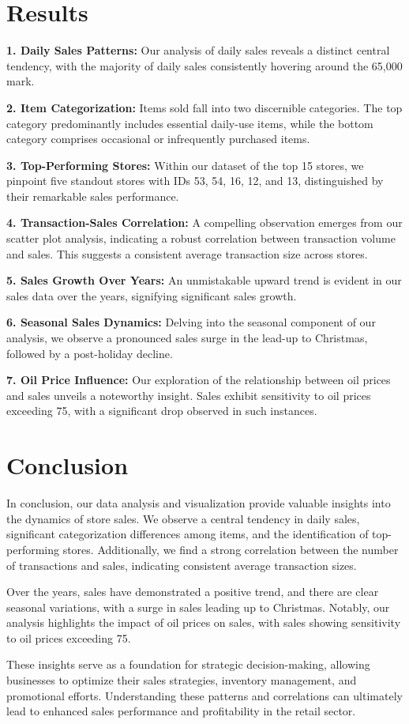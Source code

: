 \documentclass[
]{article}
\begin{document}
\hypertarget{results}{%
\section{Results}\label{results}}

\textbf{1. Daily Sales Patterns:} Our analysis of daily sales reveals a
distinct central tendency, with the majority of daily sales consistently
hovering around the 65,000 mark.

\textbf{2. Item Categorization:} Items sold fall into two discernible
categories. The top category predominantly includes essential daily-use
items, while the bottom category comprises occasional or infrequently
purchased items.

\textbf{3. Top-Performing Stores:} Within our dataset of the top 15
stores, we pinpoint five standout stores with IDs 53, 54, 16, 12, and
13, distinguished by their remarkable sales performance.

\textbf{4. Transaction-Sales Correlation:} A compelling observation
emerges from our scatter plot analysis, indicating a robust correlation
between transaction volume and sales. This suggests a consistent average
transaction size across stores.

\textbf{5. Sales Growth Over Years:} An unmistakable upward trend is
evident in our sales data over the years, signifying significant sales
growth.

\textbf{6. Seasonal Sales Dynamics:} Delving into the seasonal component
of our analysis, we observe a pronounced sales surge in the lead-up to
Christmas, followed by a post-holiday decline.

\textbf{7. Oil Price Influence:} Our exploration of the relationship
between oil prices and sales unveils a noteworthy insight. Sales exhibit
sensitivity to oil prices exceeding 75, with a significant drop observed
in such instances.

\hypertarget{conclusion}{%
\section{Conclusion}\label{conclusion}}

In conclusion, our data analysis and visualization provide valuable
insights into the dynamics of store sales. We observe a central tendency
in daily sales, significant categorization differences among items, and
the identification of top-performing stores. Additionally, we find a
strong correlation between the number of transactions and sales,
indicating consistent average transaction sizes.

Over the years, sales have demonstrated a positive trend, and there are
clear seasonal variations, with a surge in sales leading up to
Christmas. Notably, our analysis highlights the impact of oil prices on
sales, with sales showing sensitivity to oil prices exceeding 75.

These insights serve as a foundation for strategic decision-making,
allowing businesses to optimize their sales strategies, inventory
management, and promotional efforts. Understanding these patterns and
correlations can ultimately lead to enhanced sales performance and
profitability in the retail sector.
\end{document}
